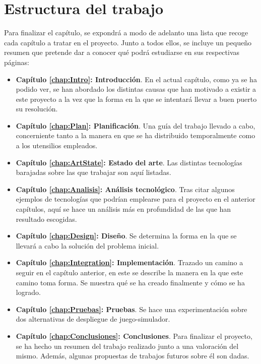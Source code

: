 \section{Estructura del trabajo}
Para finalizar el capítulo, se expondrá a modo de adelanto una lista que recoge cada capítulo a tratar en el proyecto. Junto a todos ellos, se incluye un pequeño resumen que pretende dar a conocer qué podrá estudiarse en sus respectivas páginas:
\begin{itemize}
\item \textbf{Capítulo \ref{chap:Intro}: Introducción}. En el actual capítulo, como ya se ha podido ver, se han abordado los distintas causas que han motivado a existir a este proyecto a la vez que la forma en la que se intentará llevar a buen puerto su resolución.
\item \textbf{Capítulo \ref{chap:Plan}: Planificación}. Una guía del trabajo llevado a cabo, concerniente tanto a la manera en que se ha distribuido temporalmente como a los utensilios empleados.
\item \textbf{Capítulo \ref{chap:ArtState}: Estado del arte}. Las distintas tecnologías barajadas sobre las que trabajar son aquí listadas.
\item \textbf{Capítulo \ref{chap:Analisis}: Análisis tecnológico}. Tras citar algunos ejemplos de tecnologías que podrían emplearse para el proyecto en el anterior capítulos, aquí se hace un análisis más en profundidad de las que han resultado escogidas.
\item \textbf{Capítulo \ref{chap:Design}: Diseño}. Se determina la forma en la que se llevará a cabo la solución del problema inicial.
\item \textbf{Capítulo \ref{chap:Integration}: Implementación}. Trazado un camino a seguir en el capítulo anterior, en este se describe la manera en la que este camino toma forma. Se muestra qué se ha creado finalmente y cómo se ha logrado.
\item \textbf{Capítulo \ref{chap:Pruebas}: Pruebas}. Se hace una experimentación sobre dos alternativas de despliegue de juego-simulador.
\item \textbf{Capítulo \ref{chap:Conclusiones}: Conclusiones}. Para finalizar el proyecto, se ha hecho un resumen del trabajo realizado junto a una valoración del mismo. Además, algunas propuestas de trabajos futuros sobre él son dadas.
\end{itemize}
